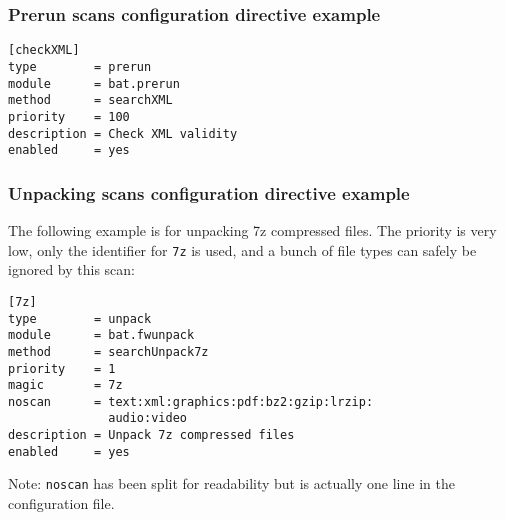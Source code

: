 \documentclass[11pt]{beamer}
\begin{document}

\begin{frame}[fragile]
\frametitle{Prerun scans configuration directive example}

\begin{verbatim}
[checkXML]
type        = prerun
module      = bat.prerun
method      = searchXML
priority    = 100
description = Check XML validity
enabled     = yes
\end{verbatim}

\end{frame}

\begin{frame}[fragile]
\frametitle{Unpacking scans configuration directive example}

The following example is for unpacking 7z compressed files. The priority is very low, only the identifier for \texttt{7z} is used, and a bunch of file types can safely be ignored by this scan:

\begin{verbatim}
[7z]
type        = unpack
module      = bat.fwunpack
method      = searchUnpack7z
priority    = 1
magic       = 7z
noscan      = text:xml:graphics:pdf:bz2:gzip:lrzip:
              audio:video
description = Unpack 7z compressed files
enabled     = yes
\end{verbatim}

Note: \texttt{noscan} has been split for readability but is actually one line in the configuration file.
\end{frame}
\end{document}
